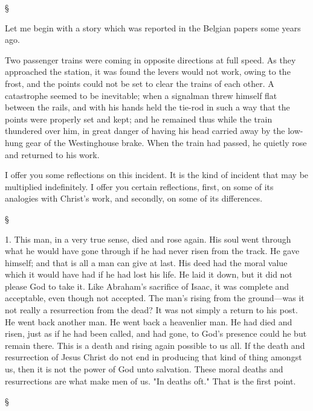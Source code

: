 \documentclass[12pt,a5paper,twoside,titlepage]{book}
\begin{document}
\begin{center} \S \end{center}

Let me begin with a story which was reported 
in the Belgian papers some years ago. 

Two passenger trains were coming in opposite 
directions at full speed. As they approached the 
station, it was found the levers would not work, 
owing to the frost, and the points could not be 
set to clear the trains of each other. A catastrophe 
seemed to be inevitable; when a signalman threw himself flat between the rails, and 
with his hands held the tie-rod in such a way 
that the points were properly set and kept; and 
he remained thus while the train thundered 
over him, in great danger of having his head 
carried away by the low-hung gear of the 
Westinghouse brake. When the train had 
passed, he quietly rose and returned to his 
work. 

I offer you some reflections on this incident. 
It is the kind of incident that may be multiplied
indefinitely. I offer you certain reflections, 
first, on some of its analogies with Christ's 
work, and secondly, on some of its differences. 

\begin{center} \S \end{center} 

1. This man, in a very true sense, died and 
rose again. His soul went through what he 
would have gone through if he had never risen 
from the track. He gave himself; and that is 
all a man can give at last. His deed had the 
moral value which it would have had if he had 
lost his life. He laid it down, but it did not 
please God to take it. Like Abraham's sacrifice 
of Isaac, it was complete and acceptable, even 
though not accepted. The man's rising from 
the ground---was it not really a resurrection 
from the dead? It was not simply a return to 
his post. He went back another man. He went 
back a heavenlier man. He had died and risen, 
just as if he had been called, and had gone, to 
God's presence could he but remain there. 
This is a death and rising again possible to us 
all. If the death and resurrection of Jesus 
Christ do not end in producing that kind of 
thing amongst us, then it is not the power of 
God unto salvation. These moral deaths and 
resurrections are what make men of us. "In 
deaths oft." That is the first point. 

\begin{center} \S \end{center} 
\end{document}
